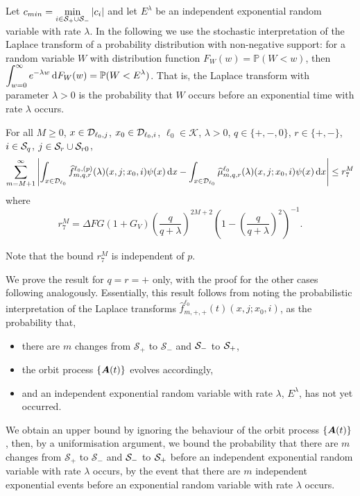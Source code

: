 Let \(c_{min} = \min\limits_{i\in\mathcal S_{+}\cup\mathcal{S}_-} |c_i|\) and let \(E^\lambda\) be an independent exponential random variable with rate \(\lambda\). In the following we use the stochastic interpretation of the Laplace transform of a probability distribution with non-negative support: for a random variable \(W\) with distribution function \(F_W(w)= \mathbb P(W<w)\), then \(\displaystyle\int_{w=0}^\infty e^{-\lambda w} \, \mathrm{d} F_W(w) = \mathbb P(W < E^{\lambda})\). That is, the Laplace transform with parameter \(\lambda >0\) is the probability that \(W\) occurs before an exponential time with rate \(\lambda\) occurs. 
\begin{lem}\label{lem: gkjljklgagjklagsjlk}For all \(M\geq 0\), \(x\in\mathcal{D}_{\ell_0,j}\), \(x_0\in\mathcal{D}_{\ell_0,i}\), \(\ell_0\in\mathcal K\), \(\lambda > 0\), \(q\in\{+,-,0\}\), \(r\in\{+,-\}\), \(i\in\mathcal{S}_q\), \(j\in\mathcal{S}_r\cup\mathcal{S}_{r0}\),
	\begin{align}
		\sum_{m=M+1}^\infty \left| \int_{x\in\mathcal{D}_{\ell_0}} \widehat f^{\ell_0,(p)}_{m,q,r}(\lambda)(x,j;x_0,i)\psi(x)\, \mathrm{d} x
		-
		\int_{x\in\mathcal{D}_{\ell_0}} \widehat \mu^{\ell_0}_{m,q,r}(\lambda)(x,j;x_0,i)\psi(x) \, \mathrm{d} x\right| \leq r_7^M
	\end{align}
	where 
	\[r_7^M =  \Delta FG(1+G_V)\left(\frac{q}{q+\lambda}\right)^{2M+2} \left(1-\left(\frac{q}{q+\lambda}\right)^2\right)^{-1} .\]
\end{lem}
Note that the bound \(r_7^M\) is independent of \(p\). 

We prove the result for \(q=r=+\) only, with the proof for the other cases following analogously. Essentially, this result follows from noting the probabilistic interpretation of the Laplace transforms \(\widehat f^{\ell_0}_{m,+,+}(t)(x,j;x_0,i)\), as the probability that, 
\begin{itemize}
	\item there are \(m\) changes from \(\mathcal S_+\) to \(\mathcal S_-\) and \(\mathcal{S}_-\) to \(\mathcal{S}_+\), 
	\item the orbit process \(\{\boldsymbol A(t)\}\) evolves accordingly, 
	\item and an independent exponential random variable with rate \(\lambda\), \(E^\lambda\), has not yet occurred.
\end{itemize}
We obtain an upper bound by ignoring the behaviour of the orbit process \(\{\boldsymbol A(t)\}\), then, by a uniformisation argument, we bound the probability that there are \(m\) changes from \(\mathcal S_+\) to \(\mathcal S_-\) and \(\mathcal{S}_-\) to \(\mathcal{S}_+\) before an independent exponential random variable with rate \(\lambda\) occurs, by the event that there are \(m\) independent exponential events before an exponential random variable with rate \(\lambda\) occurs.

